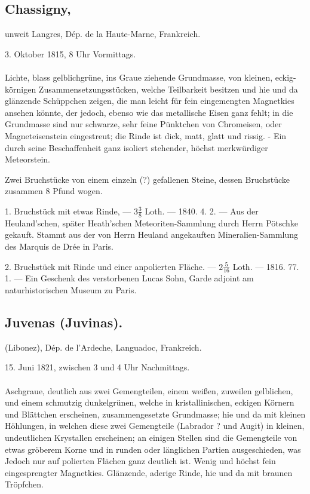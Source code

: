 \documentclass[a4paper, 11pt, oneside, polutonikogreek, german]{article}
\begin{document}
\subsection{Chassigny,}
\begin{center}
\small
unweit Langres, Dép. de la Haute-Marne, Frankreich.

3. Oktober 1815, 8 Uhr Vormittags.
\end{center}
\paragraph{}
Lichte, blass gelblichgrüne, ins Graue ziehende Grundmasse, von kleinen, eckig-körnigen Zusammensetzungsstücken, welche Teilbarkeit besitzen und hie und da glänzende Schüppchen zeigen, die man leicht für fein eingemengten Magnetkies ansehen könnte, der jedoch, ebenso wie das metallische Eisen ganz fehlt; in die Grundmasse sind nur schwarze, sehr feine Pünktchen von Chromeisen, oder Magneteisenstein eingestreut; die Rinde ist dick, matt, glatt und rissig. - Ein durch seine Beschaffenheit ganz isoliert stehender, höchst merkwürdiger Meteorstein.

Zwei Bruchstücke von einem einzeln (?) gefallenen Steine, dessen Bruchstücke zusammen 8 Pfund wogen.

1. Bruchstück mit etwas Rinde, — $3\frac{3}{8}$ Loth. — 1840. 4. 2. — Aus der Heuland’schen, später Heath’schen Meteoriten-Sammlung durch Herrn Pötschke gekauft. Stammt aus der von Herrn Heuland angekauften Mineralien-Sammlung des Marquis de Drée in Paris.

2. Bruchstück mit Rinde und einer anpolierten Fläche. — $2\frac{5}{16}$ Loth. — 1816. 77. 1. — Ein Geschenk des verstorbenen Lucas Sohn, Garde adjoint am naturhistorischen Museum zu Paris.
\subsection{Juvenas (Juvinas).}
\begin{center}
\small
(Libonez), Dép. de l'Ardeche, Languadoc, Frankreich.

15. Juni 1821, zwischen 3 und 4 Uhr Nachmittags.
\end{center}
\paragraph{}
Aschgraue, deutlich aus zwei Gemengteilen, einem weißen, zuweilen gelblichen, und einem schmutzig dunkelgrünen, welche in kristallinischen, eckigen Körnern und Blättchen erscheinen, zusammengesetzte Grundmasse; hie und da mit kleinen Höhlungen, in welchen diese zwei Gemengteile (Labrador ? und Augit) in kleinen, undeutlichen Krystallen erscheinen; an einigen Stellen sind die Gemengteile von etwas gröberem Korne und in runden oder länglichen Partien ausgeschieden, was Jedoch nur auf polierten Flächen ganz deutlich ist. Wenig und höchst fein eingesprengter Magnetkies. Glänzende, aderige Rinde, hie und da mit braunen Tröpfchen.
\end{document}
